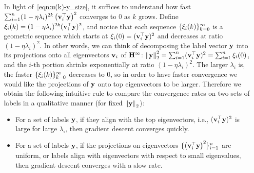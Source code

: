 
In light of~\eqref{eqn:u(k)-y_size}, it suffices to understand how fast $\sum_{i=1}^{n}(1-\eta\lambda_i)^{2k} \left(\mathbf{v}_i^\top \mathbf{y}\right)^2$ converges to $0$ as $k$ grows.
Define $\xi_i(k) =(1-\eta\lambda_i)^{2k}(\mathbf{v}_i^\top \mathbf{y})^2$, and notice that each sequence $\{\xi_i(k)\}_{k=0}^\infty$ is a geometric sequence which starts at $\xi_i(0) =(\mathbf{v}_i^\top \mathbf{y})^2$ and decreases at ratio $(1-\eta\lambda_i)^2$.
In other words, we can think of decomposing the label vector $\mathbf{y}$ into its projections onto all eigenvectors $\mathbf{v}_i$ of $\mathbf{H}^\infty$: $\left\|\mathbf{y}\right\|_2^2 = \sum_{i=1}^n (\mathbf{v}_i^\top \mathbf{y})^2 = \sum_{i=1}^n \xi_i(0)$, and the $i$-th portion shrinks exponentially at ratio $(1-\eta\lambda_i)^2$.
The larger $\lambda_i$ is, the faster $\{\xi_i(k)\}_{k=0}^\infty$ decreases to $0$, so in order to have faster convergence we would like the projections of $\mathbf{y}$ onto top eigenvectors to be larger.
Therefore we obtain the following intuitive rule to compare the convergence rates on two sets of labels in a qualitative manner (for fixed $\left\|\mathbf{y}\right\|_2$):
\begin{itemize}
	\item For a set of labels $\mathbf{y}$, if they align with the top eigenvectors, i.e., $(\mathbf{v}_i^\top \mathbf{y})^2$ is large for large $\lambda_i$, then gradient descent converges quickly.
	
	\item For a set of labels $\mathbf{y}$, if the projections on eigenvectors $\{\left(\mathbf{v}_i^\top \mathbf{y}\right)^2\}_{i=1}^n$ are uniform, or labels align with eigenvectors with respect to small eigenvalues, then gradient descent converges with a slow rate.
\end{itemize}


